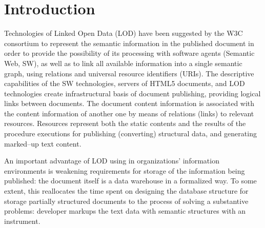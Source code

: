 \documentclass[conference,a4paper]{IEEEtran}
\begin{document}
\section{Introduction}




Technologies of Linked Open Data (LOD) \cite{b1} have been suggested by the W3C consortium to represent the semantic information in the published document in order to provide the possibility of its processing with software agents (Semantic Web, SW), as well as to link all available information into a single semantic graph, using relations and universal resource identifiers (URIs).  The descriptive capabilities of the SW technologies, servers of HTML5 documents, and LOD technologies create infrastructural basis of document publishing, providing logical links between documents.  The document content information is associated with the content information of another one by means of relations (links) to relevant resources.  Resources represent both the static contents and the results of the procedure executions for publishing (converting) structural data, and generating marked--up text content.

An important advantage of LOD using in organizations' information environments is weakening requirements for storage of the information being published: the document itself is a data warehouse in a formalized way.  To some extent, this reallocates the time spent on designing the database structure for storage partially structured documents to the process of solving a substantive problems: developer markups the text data with semantic structures with an instrument.
\end{document}
